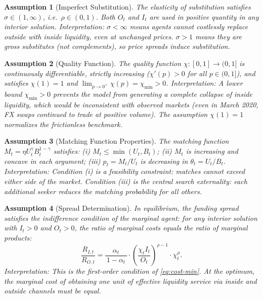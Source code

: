 \documentclass[12pt]{article}
\newtheorem{assumption}{Assumption}
\theoremstyle{definition}
\newcommand{\1}[1]{\mathds{1}\left[#1\right]}
\begin{document}
\begin{assumption}[Imperfect Substitution]
  \label{ass:sigma}
  The elasticity of substitution satisfies $\sigma \in (1, \infty)$, i.e.\
  $\rho \in (0,1)$. Both $O_t$ and $I_t$ are used in positive quantity in any
  interior solution.
  \emph{Interpretation:} $\sigma < \infty$ means agents cannot costlessly
  replace outside with inside liquidity, even at unchanged prices. $\sigma > 1$
  means they are gross substitutes (not complements), so price spreads induce
  substitution.
\end{assumption}

\begin{assumption}[Quality Function]
  \label{ass:quality}
  The quality function $\chi\colon[0,1]\to(0,1]$ is continuously
  differentiable, strictly increasing ($\chi'(p) > 0$ for all $p \in (0,1]$),
  and satisfies $\chi(1) = 1$ and $\lim_{p\to 0^+} \chi(p) = \chi_{\min} > 0$.
  \emph{Interpretation:} A lower bound $\chi_{\min} > 0$ prevents the model
  from generating a complete collapse of inside liquidity, which would be
  inconsistent with observed markets (even in March 2020, FX swaps continued to
  trade at positive volume). The assumption $\chi(1)=1$ normalizes the
  frictionless benchmark.
\end{assumption}

\begin{assumption}[Matching Function Properties]
  \label{ass:matching}
  The matching function $M_t = \eta U_t^{\gamma} B_t^{1-\gamma}$ satisfies:
  (i) $M_t \leq \min(U_t, B_t)$; (ii) $M_t$ is increasing and concave in each
  argument; (iii) $p_t = M_t/U_t$ is decreasing in $\theta_t = U_t/B_t$.
  \emph{Interpretation:} Condition (i) is a feasibility constraint: matches
  cannot exceed either side of the market. Condition (iii) is the central search
  externality: each additional seeker reduces the matching probability for all
  others.
\end{assumption}

\begin{assumption}[Spread Determination]
  \label{ass:spread}
  In equilibrium, the funding spread satisfies the indifference condition of
  the marginal agent: for any interior solution with $I_t > 0$ and $O_t > 0$,
  the ratio of marginal costs equals the ratio of marginal products:
  \begin{equation}
    \frac{R_{I,t}}{R_{O,t}} = \frac{\alpha_t}{\,1-\alpha_t\,} \cdot
    \left(\frac{\chi_t I_t}{O_t}\right)^{\rho-1} \cdot \chi_t^{\rho}.
    \label{eq:foc}
  \end{equation}
  \emph{Interpretation:} This is the first-order condition of
  \eqref{eq:cost-min}. At the optimum, the marginal cost of obtaining one unit
  of effective liquidity service via inside and outside channels must be equal.
\end{assumption}
\end{document}
